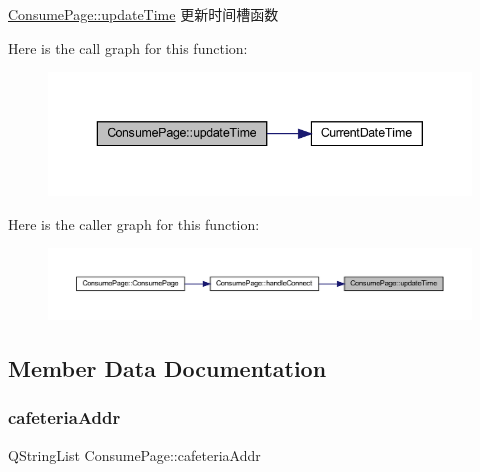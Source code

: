\mbox{\hyperlink{class_consume_page_ad00cdadd4302bfb963b4e1c2487b7653}{Consume\+Page\+::update\+Time}} 更新时间槽函数 

Here is the call graph for this function\+:
\nopagebreak
\begin{figure}[H]
\begin{center}
\leavevmode
\includegraphics[width=343pt]{class_consume_page_ad00cdadd4302bfb963b4e1c2487b7653_cgraph}
\end{center}
\end{figure}
Here is the caller graph for this function\+:
\nopagebreak
\begin{figure}[H]
\begin{center}
\leavevmode
\includegraphics[width=350pt]{class_consume_page_ad00cdadd4302bfb963b4e1c2487b7653_icgraph}
\end{center}
\end{figure}


\subsection{Member Data Documentation}
\mbox{\label{class_consume_page_a7cfd5d301069ce79ad431d89201b1703}} 
\subsubsection{\texorpdfstring{cafeteriaAddr}{cafeteriaAddr}}
{\footnotesize\ttfamily Q\+String\+List Consume\+Page\+::cafeteria\+Addr\hspace{0.3cm}{\ttfamily [private]}}

\mbox{\label{class_consume_page_a5f32182a0c6a200572cbe6a3205cfa82}} 
